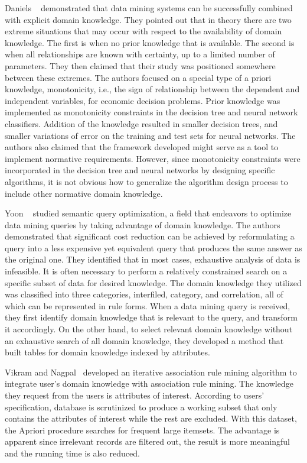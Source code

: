 Daniels \etal~\cite{Daniels01} demonstrated that data mining systems can be successfully combined with explicit domain knowledge. They pointed out that in theory there are two extreme situations that may occur with respect to the availability of domain knowledge. The first is when no prior knowledge that is available. The second is when all relationships are known with certainty, up to a limited number of parameters. They then claimed that their study was positioned somewhere between these extremes. The authors focused on a special type of a priori knowledge, monotonicity, i.e., the sign of relationship between the dependent and independent variables, for economic decision problems. Prior knowledge was implemented as monotonicity constraints in the decision tree and neural network classifiers. Addition of the knowledge resulted in smaller decision trees, and smaller variations of error on the training and test sets for neural networks. The authors also claimed that the framework developed might serve as a tool to implement normative requirements. However, since monotonicity constraints were incorporated in the decision tree and neural networks by designing specific algorithms, it is not obvious how to generalize the algorithm design process to include other normative domain knowledge.

Yoon \etal~\cite{Yoon1999} studied semantic query optimization, a field that endeavors to optimize data mining queries by taking advantage of domain knowledge. The authors demonstrated that significant cost reduction can be achieved by reformulating a query into a less expensive yet equivalent query that produces the same answer as the original one. They identified that in most cases, exhaustive analysis of data is infeasible. It is often necessary to perform a relatively constrained search on a specific subset of data for desired knowledge. The domain knowledge they utilized was classified into three categories, interfiled, category, and correlation, all of which can be represented in rule forms. When a data mining query is received, they first identify domain knowledge that is relevant to the query, and transform it accordingly. On the other hand, to select relevant domain knowledge without an exhaustive search of all domain knowledge, they developed a method that built tables for domain knowledge indexed by attributes.

Vikram and Nagpal~\cite{Vikram2010} developed an iterative association rule mining algorithm to integrate user's domain knowledge with association rule mining. The knowledge they request from the users is attributes of interest. According to users' specification, database is scrutinized to produce a working subset that only contains the attributes of interest while the rest are excluded. With this dataset, the Apriori procedure searches for frequent large itemsets. The advantage is apparent since irrelevant records are filtered out, the result is more meaningful and the running time is also reduced.


